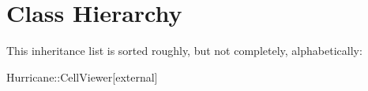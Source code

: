 \section{Class Hierarchy}
This inheritance list is sorted roughly, but not completely, alphabetically\+:\begin{DoxyCompactList}
\item Hurricane\+:\+:Cell\+Viewer{\ttfamily  \mbox{[}external\mbox{]}}\begin{DoxyCompactList}
\item {}
\end{DoxyCompactList}
\end{DoxyCompactList}
